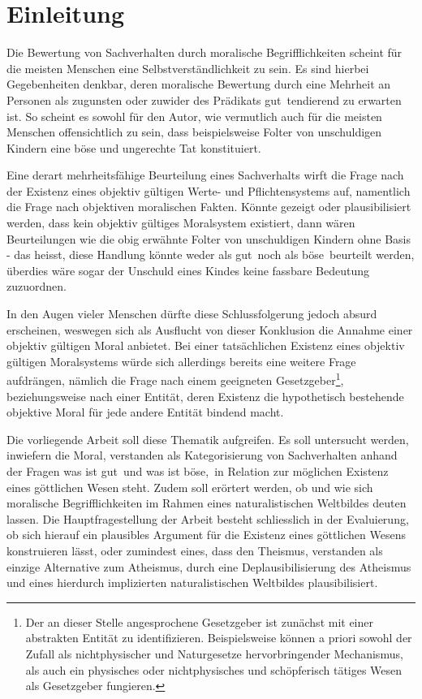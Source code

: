 \documentclass[a4paper,11pt]{article}
\numberwithin{equation}{section}
\begin{document}
\section{Einleitung}
Die Bewertung von Sachverhalten durch moralische Begrifflichkeiten scheint für die meisten Menschen eine Selbstverständlichkeit zu sein. Es sind hierbei Gegebenheiten denkbar, deren moralische Bewertung durch eine Mehrheit an Personen als zugunsten oder zuwider des Prädikats \flqq gut\frqq\  tendierend zu erwarten ist. So scheint es sowohl für den Autor, wie vermutlich auch für die meisten Menschen offensichtlich zu sein, dass beispielsweise Folter von unschuldigen Kindern eine böse und ungerechte Tat konstituiert. 

Eine derart mehrheitsfähige Beurteilung eines Sachverhalts wirft die Frage nach der Existenz eines objektiv gültigen Werte- und Pflichtensystems auf, namentlich die Frage nach objektiven moralischen Fakten. Könnte gezeigt oder plausibilisiert werden, dass kein objektiv gültiges Moralsystem existiert, dann wären Beurteilungen wie die obig erwähnte Folter von unschuldigen Kindern ohne Basis - das heisst, diese Handlung könnte weder als \flqq gut\frqq\ noch als \flqq böse\frqq\ beurteilt werden, überdies wäre sogar der Unschuld eines Kindes keine fassbare Bedeutung zuzuordnen. 

In den Augen vieler Menschen dürfte diese Schlussfolgerung jedoch absurd erscheinen, weswegen sich als Ausflucht von dieser Konklusion die Annahme einer objektiv gültigen Moral anbietet. Bei einer tatsächlichen Existenz eines objektiv gültigen Moralsystems würde sich allerdings bereits eine weitere Frage aufdrängen, nämlich die Frage nach einem geeigneten Gesetzgeber\footnote{Der an dieser Stelle angesprochene Gesetzgeber ist zunächst mit einer abstrakten Entität zu identifizieren. Beispielsweise können a priori sowohl der Zufall als nichtphysischer und Naturgesetze hervorbringender Mechanismus, als auch ein physisches oder nichtphysisches und schöpferisch tätiges Wesen als Gesetzgeber fungieren.}, beziehungsweise nach einer Entität, deren Existenz die hypothetisch bestehende objektive Moral für jede andere Entität bindend macht. 

Die vorliegende Arbeit soll diese Thematik aufgreifen. Es soll untersucht werden, inwiefern die Moral, verstanden als Kategorisierung von Sachverhalten anhand der Fragen \flqq was ist gut\frqq\ und \flqq was ist böse\frqq,\ in Relation zur möglichen Existenz eines göttlichen Wesen steht. Zudem soll erörtert werden, ob und wie sich moralische Begrifflichkeiten im Rahmen eines naturalistischen Weltbildes deuten lassen. Die Hauptfragestellung der Arbeit besteht schliesslich in der Evaluierung, ob sich hierauf ein plausibles Argument für die Existenz eines göttlichen Wesens konstruieren lässt, oder zumindest eines, dass den Theismus, verstanden als einzige Alternative zum Atheismus, durch eine Deplausibilisierung des Atheismus und eines hierdurch implizierten naturalistischen Weltbildes plausibilisiert.
\end{document}
